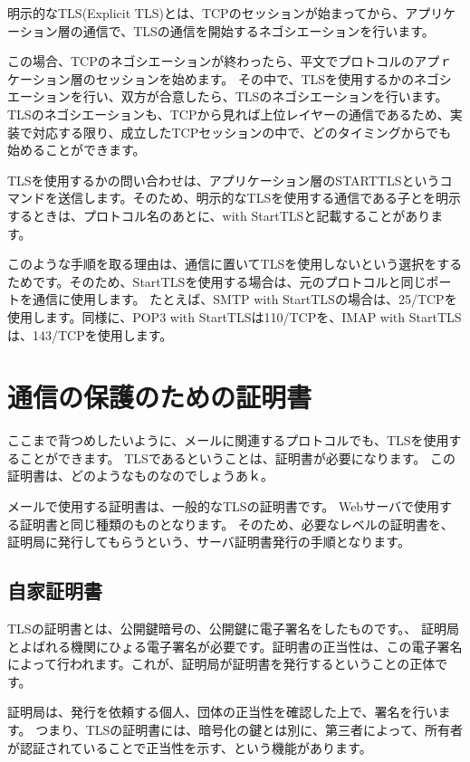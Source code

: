 明示的なTLS(Explicit TLS)とは、TCPのセッションが始まってから、アプリケーション層の通信で、TLSの通信を開始するネゴシエーションを行います。

この場合、TCPのネゴシエーションが終わったら、平文でプロトコルのアプｒケーション層のセッションを始めます。
その中で、TLSを使用するかのネゴシエーションを行い、双方が合意したら、TLSのネゴシエーションを行います。
TLSのネゴシエーションも、TCPから見れば上位レイヤーの通信であるため、実装で対応する限り、成立したTCPセッションの中で、どのタイミングからでも始めることができます。

TLSを使用するかの問い合わせは、アプリケーション層のSTARTTLSというコマンドを送信します。そのため、明示的なTLSを使用する通信である子とを明示するときは、プロトコル名のあとに、with StartTLSと記載することがあります。

このような手順を取る理由は、通信に置いてTLSを使用しないという選択をするためです。そのため、StartTLSを使用する場合は、元のプロトコルと同じポートを通信に使用します。
たとえば、SMTP with StartTLSの場合は、25/TCPを使用します。同様に、POP3 with StartTLSは110/TCPを、IMAP with StartTLSは、143/TCPを使用します。

\section{通信の保護のための証明書}

ここまで背つめしたいように、メールに関連するプロトコルでも、TLSを使用することができます。
TLSであるということは、証明書が必要になります。
この証明書は、どのようなものなのでしょうあｋ。

メールで使用する証明書は、一般的なTLSの証明書です。
Webサーバで使用する証明書と同じ種類のものとなります。
そのため、必要なレベルの証明書を、証明局に発行してもらうという、サーバ証明書発行の手順となります。

\subsection{自家証明書}

TLSの証明書とは、公開鍵暗号の、公開鍵に電子署名をしたものです。、
証明局とよばれる機関にひょる電子署名が必要です。証明書の正当性は、この電子署名によって行われます。これが、証明局が証明書を発行するということの正体です。

証明局は、発行を依頼する個人、団体の正当性を確認した上で、署名を行います。
つまり、TLSの証明書には、暗号化の鍵とは別に、第三者によって、所有者が認証されていることで正当性を示す、という機能があります。


